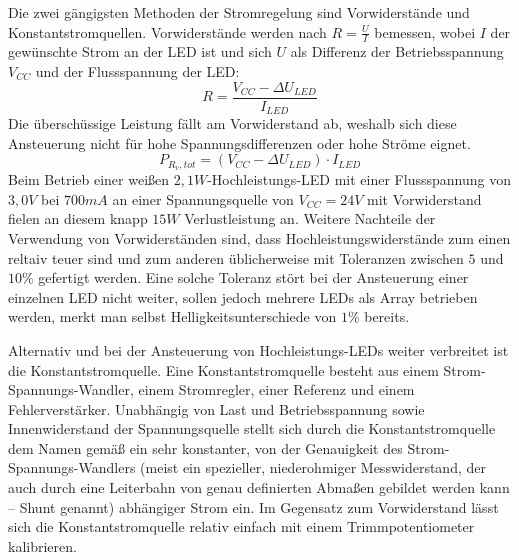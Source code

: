 \documentclass[12pt,a4paper,notitlepage]{article}
\begin{document}
Die zwei gängigsten Methoden der Stromregelung sind Vorwiderstände und Konstantstromquellen. Vorwiderstände werden nach $R=\frac{U}{I}$ bemessen, wobei $I$ der gewünschte Strom an der \gls{LED} ist und sich $U$ als Differenz der Betriebsspannung $V_{CC}$ und der \gls{Flussspannung} der \gls{LED}:
\begin{equation}
R=\frac{V_{CC}-\Delta U_{LED}}{I_{LED}}
\end{equation}
Die überschüssige Leistung fällt am Vorwiderstand ab, weshalb sich diese Ansteuerung nicht für hohe Spannungsdifferenzen oder hohe Ströme eignet.
\begin{equation}
P_{R_v,tot}=\left(V_{CC}-\Delta U_{LED}\right)\cdot I_{LED}
\end{equation}
Beim Betrieb einer weißen $2,1W$-Hochleistungs-\gls{LED} mit einer Flussspannung von $3,0V$ bei $700mA$ an einer Spannungsquelle von $V_{CC}=24V$ mit Vorwiderstand fielen an diesem knapp $15W$ Verlustleistung an.
Weitere Nachteile der Verwendung von Vorwiderständen sind, dass Hochleistungswiderstände zum einen reltaiv teuer sind und zum anderen üblicherweise mit Toleranzen zwischen $5$ und $10\%$ gefertigt werden. Eine solche Toleranz stört bei der Ansteuerung einer einzelnen \gls{LED} nicht weiter, sollen jedoch mehrere \glspl{LED} als Array betrieben werden, merkt man selbst Helligkeitsunterschiede von $1\%$ bereits.

Alternativ und bei der Ansteuerung von Hochleistungs-\glspl{LED} weiter verbreitet ist die Konstantstromquelle. Eine Konstantstromquelle besteht aus einem Strom-Spannungs-Wandler, einem Stromregler, einer Referenz und einem Fehlerverstärker. Unabhängig von Last und Betriebsspannung sowie Innenwiderstand der Spannungsquelle stellt sich durch die Konstantstromquelle dem Namen gemäß ein sehr konstanter, von der Genauigkeit des Strom-Spannungs-Wandlers (meist ein spezieller, niederohmiger Messwiderstand, der auch durch eine Leiterbahn von genau definierten Abmaßen gebildet werden kann -- \gls{Shunt} genannt) abhängiger Strom ein. Im Gegensatz zum Vorwiderstand lässt sich die Konstantstromquelle relativ einfach mit einem Trimmpotentiometer kalibrieren.
\end{document}
